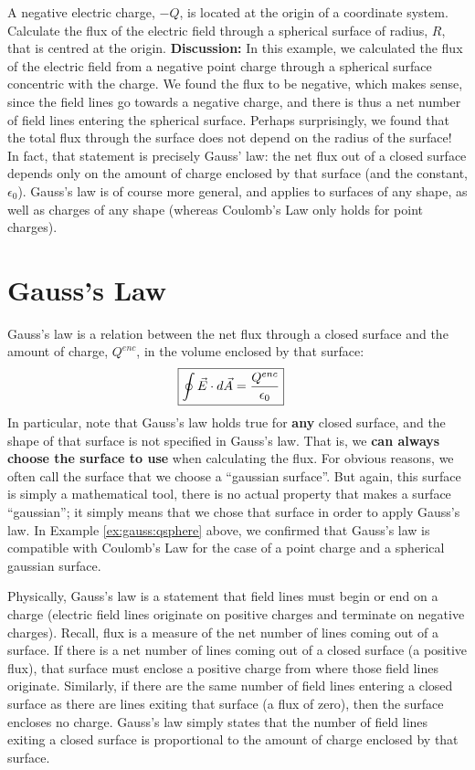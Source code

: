 \begin{example}{A negative electric charge, $-Q$, is located at the origin of a coordinate system. Calculate the flux of the electric field through a spherical surface of radius, $R$, that is centred at the origin.}
\textbf{Discussion: }In this example, we calculated the flux of the electric field from a negative point charge through a spherical surface concentric with the charge. We found the flux to be negative, which makes sense, since the field lines go towards a negative charge, and there is thus a net number of field lines entering the spherical surface. Perhaps surprisingly, we found that the total flux through the surface does not depend on the radius of the surface! In fact, that statement is precisely Gauss' law: the net flux out of a closed surface depends only on the amount of charge enclosed by that surface (and the constant, $\epsilon_0$). Gauss's law is of course more general, and applies to surfaces of any shape, as well as charges of any shape (whereas Coulomb's Law only holds for point charges). 
\end{example}

\section{Gauss's Law}
Gauss's law is a relation between the net flux through a closed surface and the amount of charge, $Q^{enc}$, in the volume enclosed by that surface:
\begin{align*}
\Aboxed{\oint \vec E\cdot d\vec A=\frac{Q^{enc}}{\epsilon_0}}
\end{align*}
In particular, note that Gauss's law holds true for \textbf{any} closed surface, and the shape of that surface is not specified in Gauss's law.  That is, we \textbf{can always choose the surface to use} when calculating the flux. For obvious reasons, we often call the surface that we choose a ``gaussian surface''. But again, this surface is simply a mathematical tool, there is no actual property that makes a surface ``gaussian''; it simply means that we chose that surface in order to apply Gauss's law.  In Example \ref{ex:gauss:qsphere} above, we confirmed that Gauss's law is compatible with Coulomb's Law for the case of a point charge and a spherical gaussian surface. 

Physically, Gauss's law is a statement that field lines must begin or end on a charge (electric field lines originate on positive charges and terminate on negative charges). Recall, flux is a measure of the net number of lines coming out of a surface. If there is a net number of lines coming out of a closed surface (a positive flux), that surface must enclose a positive charge from where those field lines originate. Similarly, if there are the same number of field lines entering a closed surface as there are lines exiting that surface (a flux of zero), then the surface encloses no charge. Gauss's law simply states that the number of field lines exiting a closed surface is proportional to the amount of charge enclosed by that surface.

